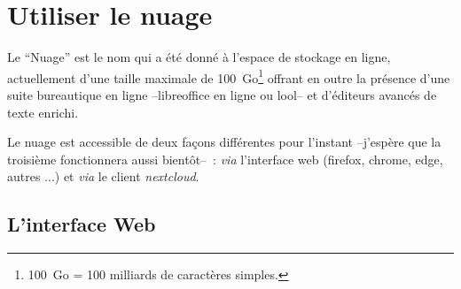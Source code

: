 \chapter{Utiliser le nuage}

Le ``Nuage'' est le nom qui a été donné à l'espace de stockage en ligne, actuellement d'une taille maximale de 100~Go\footnote{%
100~Go = 100 milliards de caractères simples.
} 
offrant en outre la présence d'une suite bureautique en ligne --libreoffice en ligne ou lool-- et d'éditeurs avancés de texte enrichi.

Le nuage est accessible de deux façons différentes pour l'instant --j'espère que la troisième fonctionnera aussi bientôt--~: \emph{via} l'interface web (firefox, chrome, edge, autres ...) et \emph{via} le client \emph{nextcloud}.

\section{L'interface Web}

